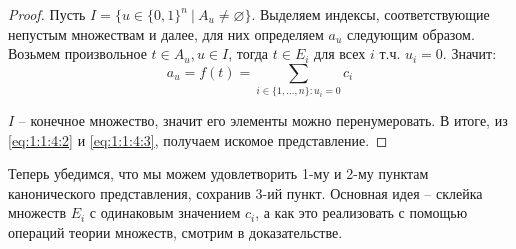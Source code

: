 \documentclass[../main.tex]{subfiles}
\begin{document}
\begin{proof}
	Пусть $I = \{u \in \{0, 1\}^n \ | \ A_u \neq \varnothing\}$. Выделяем индексы, соответствующие непустым множествам и далее, для них определяем $a_u$ следующим образом. Возьмем произвольное $t \in A_u, u \in I$, тогда $t \in E_i$ для всех $i$ т.ч. $u_i = 0$. Значит:
	\begin{equation}\label{eq:1:1:4:3}
		a_u = f(t) = \sum_{i \in \{1, ..., n\} : u_i = 0}{c_i}
	\end{equation}

	$I$ -- конечное множество, значит его элементы можно перенумеровать. В итоге, из \eqref{eq:1:1:4:2} и \eqref{eq:1:1:4:3}, получаем искомое представление.
\end{proof}

Теперь убедимся, что мы можем удовлетворить 1-му и 2-му пунктам канонического представления, сохранив 3-ий пункт. Основная идея -- склейка множеств $E_i$ с одинаковым значением $c_i$, а как это реализовать с помощью операций теории множеств, смотрим в доказательстве.
\end{document}
